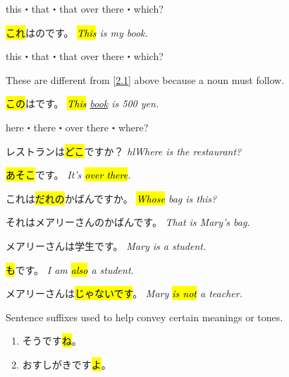     {
    this・that・that over there・which?

    \hl{これ}はのです。
    \textit{\hl{This} is my book.}
    }

    {
    this・that・that over there・which?
    
    These are different from \ref{2.1} above because a noun must follow.

    \hl{この}はです。
    \textit{\hl{This} \underline{book} is 500 yen.}
    }
    
    {
    here・there・over there・where?

    レストランは\hl{どこ}ですか？
    \textit{hl{Where} is the restaurant?}

    \hl{あそこ}です。
    \textit{It's \hl{over there}.}
    }

    {
    これは\hl{だれの}かばんですか。
    \textit{\hl{Whose} bag is this?}

    それはメアリーさんのかばんです。
    \textit{That is Mary's bag.}
    }
    
    {
    メアリーさんは学生です。
    \textit{Mary is a student.}

    \hl{も}です。
    \textit{I am \hl{also} a student.}
    }
    
    {
    メアリーさんは\hl{じゃないです}。
    \textit{Mary \hl{is not} a teacher.} 
    }

    {
    Sentence suffixes used to help convey certain meanings or tones.
    \begin{enumerate}
        \item そうです\hl{ね}。
        \item おすしがきです\hl{よ}。
    \end{enumerate}
    }
